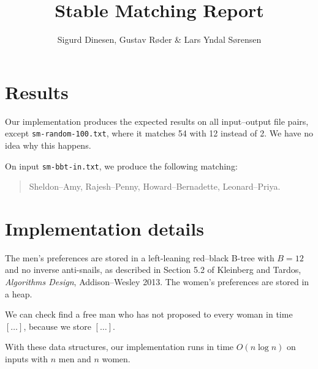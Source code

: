 \documentclass{tufte-handout}
\title{Stable Matching Report}
\author{Sigurd Dinesen, Gustav Røder \& Lars Yndal Sørensen}
\begin{document}
  \maketitle

  \section{Results}

  Our implementation produces the expected results on all input--output file pairs, except {\tt sm-random-100.txt}, where it matches 54 with 12 instead of 2.
  We have no idea why this happens.%

  On input {\tt sm-bbt-in.txt}, we produce the following matching:
  \begin{quotation}
    Sheldon--Amy, Rajesh--Penny, Howard--Bernadette, Leonard--Priya.  
  \end{quotation}

  \section{Implementation details}

  The men's preferences are stored in a left-leaning red--black B-tree with $B=12$ and no inverse anti-snails,%
   as described in Section 5.2 of Kleinberg and Tardos, \emph{Algorithms Design}, Addison--Wesley 2013.%
  The women's preferences are stored in a heap.

  We can check find a free man who has not proposed to every woman in time $[\ldots]$,
  because we store $[\ldots]$.

  With these data structures, our implementation runs in time $O(n\log n)$  
  on inputs with $n$ men and $n$ women.
\end{document}
